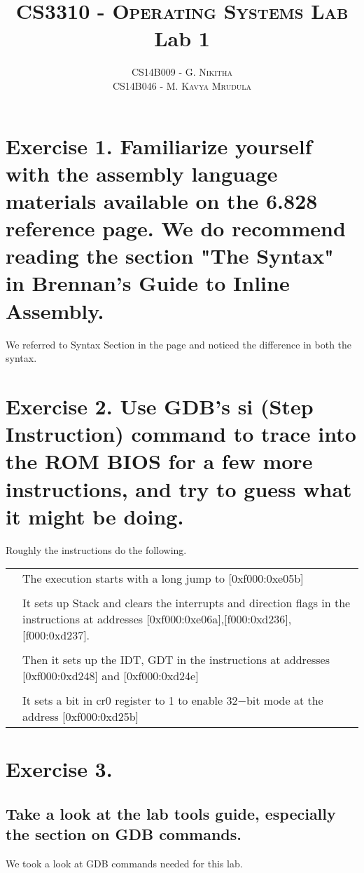 \documentclass[a4paper]{article}
\title{
	\normalsize \textsc{CS3310 - Operating Systems Lab} \\
	\huge Lab 1 \\ [-10pt]
}
\author{	
		\normalsize CS14B009 - \textsc{G. Nikitha} \\ [-3pt]
		\normalsize CS14B046 - \textsc{M. Kavya Mrudula} 
}
\date{}
\begin{document}
	\maketitle
	\section{Exercise 1. Familiarize yourself with the assembly language materials available on the 6.828 reference page. We do recommend reading the section "The Syntax" in Brennan's Guide to Inline Assembly.}
	\textbullet \quad We referred to Syntax Section in the page and noticed the difference in both the syntax.
	\section{Exercise 2. Use GDB's si (Step Instruction) command to trace into the ROM BIOS for a few more instructions, and try to guess what it might be doing.}
	\textbullet \quad Roughly the instructions do the following. \\
	\begin{tabularx}{\textwidth}{R{0.05}|L{.75}}
		 & The execution starts with a long jump to [0xf000:0xe05b] \\ 
		 \vspace{-1.8ex} \\
		 & It sets up Stack and clears the interrupts and direction flags in the instructions at addresses [0xf000:0xe06a],[f000:0xd236], [f000:0xd237]. \\
		 \vspace{-1.8ex} \\
		 & Then it sets up the IDT, GDT in the instructions at addresses [0xf000:0xd248] and [0xf000:0xd24e] \\
		 \vspace{-1.8ex} \\ 
		 & It sets a bit in cr0 register to 1 to enable 32$-$bit mode at the address [0xf000:0xd25b]
	\end{tabularx}
	\section{Exercise 3.}
		\subsection{Take a look at the lab tools guide, especially the section on GDB commands.}
		\qquad \textbullet \quad  We took a look at GDB commands needed for this lab.
\end{document}
